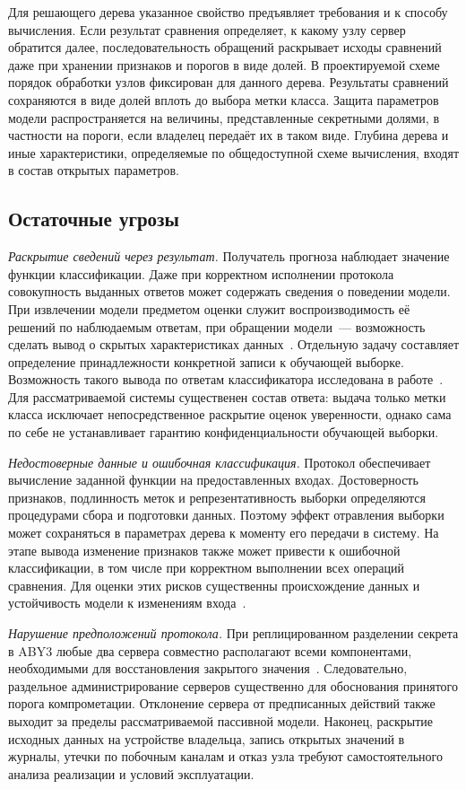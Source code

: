 Для решающего дерева указанное свойство предъявляет требования и к способу
вычисления. Если результат сравнения определяет, к какому узлу сервер
обратится далее, последовательность обращений раскрывает исходы сравнений
даже при хранении признаков и порогов в виде долей. В проектируемой схеме
порядок обработки узлов фиксирован для данного дерева. Результаты сравнений
сохраняются в виде долей вплоть до выбора метки класса. Защита параметров
модели распространяется на величины, представленные секретными долями,
в частности на пороги, если владелец передаёт их в таком виде.
Глубина дерева и иные характеристики, определяемые по общедоступной
схеме вычисления, входят в состав открытых параметров.

\subsection{Остаточные угрозы}

\textit{Раскрытие сведений через результат.}
Получатель прогноза наблюдает значение функции классификации.
Даже при корректном исполнении протокола совокупность выданных ответов
может содержать сведения о поведении модели. При извлечении модели
предметом оценки служит воспроизводимость её решений по наблюдаемым
ответам, при обращении модели~--- возможность сделать вывод о скрытых
характеристиках данных~\cite{papernot2018sok}. Отдельную задачу составляет
определение принадлежности конкретной записи к обучающей выборке.
Возможность такого вывода по ответам классификатора исследована
в работе~\cite{shokri2017mia}. Для рассматриваемой системы существенен
состав ответа: выдача только метки класса исключает непосредственное
раскрытие оценок уверенности, однако сама по себе не устанавливает
гарантию конфиденциальности обучающей выборки.

\textit{Недостоверные данные и ошибочная классификация.}
Протокол обеспечивает вычисление заданной функции на предоставленных
входах. Достоверность признаков, подлинность меток и репрезентативность
выборки определяются процедурами сбора и подготовки данных. Поэтому эффект
отравления выборки может сохраняться в параметрах дерева к моменту его
передачи в систему. На этапе вывода изменение признаков также может
привести к ошибочной классификации, в том числе при корректном выполнении
всех операций сравнения. Для оценки этих рисков существенны происхождение
данных и устойчивость модели к изменениям входа~\cite{ilyushin2022attacks}.

\textit{Нарушение предположений протокола.}
При реплицированном разделении секрета в ABY3 любые два сервера совместно
располагают всеми компонентами, необходимыми для восстановления закрытого
значения~\cite{mohassel2018aby3}. Следовательно, раздельное администрирование
серверов существенно для обоснования принятого порога компрометации.
Отклонение сервера от предписанных действий также выходит за пределы
рассматриваемой пассивной модели. Наконец, раскрытие исходных данных
на устройстве владельца, запись открытых значений в журналы, утечки
по побочным каналам и отказ узла требуют самостоятельного анализа
реализации и условий эксплуатации.

